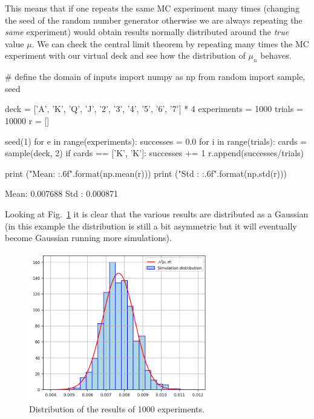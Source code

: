 This means that if one repeats the same MC experiment many times (changing the seed of the random number generator otherwise we are always repeating the \emph{same} experiment) would obtain results normally distributed around the \emph{true} value \(\mu\).
We can check the central limit theorem by repeating many times the MC experiment with our virtual deck and see how the distribution of $\mu_n$ behaves.

\begin{ipython}
# define the domain of inputs
import numpy as np
from random import sample, seed

deck = ['A', 'K', 'Q', 'J', '2', '3', '4', '5', '6', '7'] * 4
experiments = 1000
trials = 10000
r = []

seed(1)
for e in range(experiments):
    successes = 0.0
    for i in range(trials):
        cards = sample(deck, 2)
        if cards == ['K', 'K']:
            successes += 1
    r.append(successes/trials)

print ("Mean: {:.6f}".format(np.mean(r)))
print ("Std : {:.6f}".format(np.std(r)))
\end{ipython}
\begin{ioutput}
Mean:  0.007688
Std :  0.000871
\end{ioutput}

Looking at Fig.~\ref{fig:repeated_MC} it is clear that the various results are distributed as a Gaussian (in this example the distribution is still a bit asymmetric but it will eventually become Gaussian running more simulations).

\begin{figure}[htb]
\centering
\includegraphics[width=0.7\textwidth]{figures/experiment_distribution}
\caption{Distribution of the results of 1000 experiments.}
\label{fig:repeated_MC}
\end{figure}

